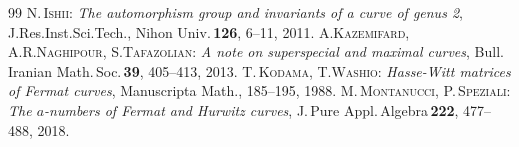 \documentclass[10pt,a4paper]{amsart}
\begin{document}
\begin{thebibliography}{99}
 \textsc{N.\,Ishii}: \textit{The automorphism group and invariants of a curve of genus 2}, J.\hspace{0.8mm}Res.\hspace{0.8mm}Inst.\hspace{0.8mm}Sci.\hspace{0.8mm}Tech., Nihon Univ.\,{\bf 126}, 6--11, 2011.\vspace{-1mm}
 \textsc{A\hspace{-0.2mm}.\hspace{0.6mm}Kazemifard, A.\hspace{0.5mm}R.\hspace{0.5mm}Naghipour, S.\hspace{0.3mm}Tafazolian}: \textit{A note on superspecial and maximal curves}, Bull. Iranian Math.\,Soc.\,{\bf 39}, 405--413, 2013.\vspace{-1mm}
 \textsc{T\hspace{-0.2mm}.\,Kodama, \hspace{-0.2mm}T\hspace{-0.2mm}.\hspace{0.5mm}Washio}: \textit{Hasse-Witt matrices of Fermat curves}, Manuscripta Math.\hspace{0.5mm}{\bf 60}, 185--195, 1988.\vspace{-1mm}
 \textsc{M\hspace{-0.1mm}.\,Montanucci, P\hspace{-0.4mm}.\,Speziali}: \hspace{-0.3mm}\textit{The $a$-numbers of Fermat and Hurwitz curves}, J\hspace{-0.2mm}.\,Pure \hspace{-0.2mm}Appl.\,Algebra\,{\bf 222}, 477--488, 2018.\vspace{-1mm}

\end{thebibliography}
\end{document}
